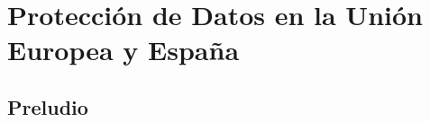 \appendix
\chapter{Protección de Datos en la Unión Europea y España}\label{Obj}
\thispagestyle{fancy}
\section{Preludio}

